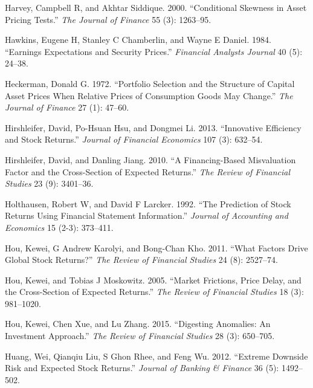 \documentclass[
  letterpaper,
  DIV=11,
  numbers=noendperiod]{scrreprt}
\newlength{\cslhangindent}
\newlength{\cslentryspacingunit} %
\newenvironment{CSLReferences}[2] %
 {%
  \setlength{\parindent}{0pt}
  \ifodd #1
  \let\oldpar\par
  \def\par{\hangindent=\cslhangindent\oldpar}
  \fi
  \setlength{\parskip}{#2\cslentryspacingunit}
 }%
 {}
\begin{document}
\begin{CSLReferences}{1}{0}
\leavevmode{}%
Harvey, Campbell R, and Akhtar Siddique. 2000. {``Conditional Skewness
in Asset Pricing Tests.''} \emph{The Journal of Finance} 55 (3):
1263--95.

\leavevmode{}%
Hawkins, Eugene H, Stanley C Chamberlin, and Wayne E Daniel. 1984.
{``Earnings Expectations and Security Prices.''} \emph{Financial
Analysts Journal} 40 (5): 24--38.

\leavevmode{}%
Heckerman, Donald G. 1972. {``Portfolio Selection and the Structure of
Capital Asset Prices When Relative Prices of Consumption Goods May
Change.''} \emph{The Journal of Finance} 27 (1): 47--60.

\leavevmode{}%
Hirshleifer, David, Po-Hsuan Hsu, and Dongmei Li. 2013. {``Innovative
Efficiency and Stock Returns.''} \emph{Journal of Financial Economics}
107 (3): 632--54.

\leavevmode{}%
Hirshleifer, David, and Danling Jiang. 2010. {``A Financing-Based
Misvaluation Factor and the Cross-Section of Expected Returns.''}
\emph{The Review of Financial Studies} 23 (9): 3401--36.

\leavevmode{}%
Holthausen, Robert W, and David F Larcker. 1992. {``The Prediction of
Stock Returns Using Financial Statement Information.''} \emph{Journal of
Accounting and Economics} 15 (2-3): 373--411.

\leavevmode{}%
Hou, Kewei, G Andrew Karolyi, and Bong-Chan Kho. 2011. {``What Factors
Drive Global Stock Returns?''} \emph{The Review of Financial Studies} 24
(8): 2527--74.

\leavevmode{}%
Hou, Kewei, and Tobias J Moskowitz. 2005. {``Market Frictions, Price
Delay, and the Cross-Section of Expected Returns.''} \emph{The Review of
Financial Studies} 18 (3): 981--1020.

\leavevmode{}%
Hou, Kewei, Chen Xue, and Lu Zhang. 2015. {``Digesting Anomalies: An
Investment Approach.''} \emph{The Review of Financial Studies} 28 (3):
650--705.

\leavevmode{}%
Huang, Wei, Qianqiu Liu, S Ghon Rhee, and Feng Wu. 2012. {``Extreme
Downside Risk and Expected Stock Returns.''} \emph{Journal of Banking \&
Finance} 36 (5): 1492--502.


\end{CSLReferences}
\end{document}
